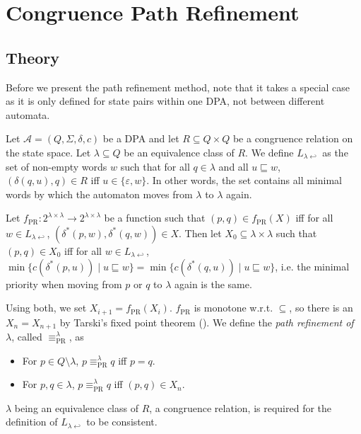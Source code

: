 
\chapter{Congruence Path Refinement}
\label{chap:pr}

\section{Theory}

Before we present the path refinement method, note that it takes a special case as it is only defined for state pairs within one DPA, not between different automata.

\begin{defn}
	Let $\mathcal{A} = (Q, \Sigma, \delta, c)$ be a DPA and let $R \subseteq Q \times Q$ be a congruence relation on the state space. Let $\lambda \subseteq Q$ be an equivalence class of $R$. We define $L_{\lambda \hookleftarrow}$ as the set of non-empty words $w$ such that for all $q \in \lambda$ and all $u \sqsubseteq w$, $(\delta(q, u), q) \in R$ iff $u \in \{\varepsilon, w\}$. In other words, the set contains all minimal words by which the automaton moves from $\lambda$ to $\lambda$ again.
	
	Let $f_\text{PR} : 2^{\lambda \times \lambda} \rightarrow 2^{\lambda \times \lambda}$ be a function such that $(p, q) \in f_\text{PR}(X)$  iff for all $w \in L_{\lambda \hookleftarrow}$, $(\delta^*(p, w), \delta^*(q, w)) \in X$.
	Then let $X_0 \subseteq \lambda \times \lambda$ such that $(p, q) \in X_0$ iff for all $w \in L_{\lambda \hookleftarrow}$, $\min \{ c(\delta^*(p, u)) \mid u \sqsubseteq w \} = \min \{ c(\delta^*(q, u)) \mid u \sqsubseteq w \}$, i.e. the minimal priority when moving from $p$ or $q$ to $\lambda$ again is the same.
	
	Using both, we set $X_{i+1} = f_\text{PR}(X_i)$. $f_\text{PR}$ is monotone w.r.t. $\subseteq$, so there is an $X_n = X_{n+1}$ by Tarski's fixed point theorem (\cite{Tarski1955}). We define the \emph{path refinement of $\lambda$}, called $\equiv_\text{PR}^\lambda$, as
	\begin{itemize}
		\item For $p \in Q \setminus \lambda$, $p \equiv_\text{PR}^\lambda q$ iff $p = q$.
		\item For $p, q \in \lambda$, $p \equiv_\text{PR}^\lambda q$ iff $(p, q) \in X_n$.
	\end{itemize}
\end{defn}

$\lambda$ being an equivalence class of $R$, a congruence relation, is required for the definition of $L_{\lambda \hookleftarrow}$ to be consistent.

